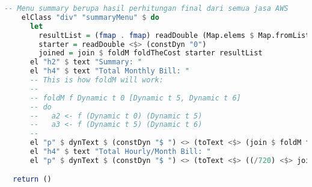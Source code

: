 \documentclass[pi.tex]{subfile}
\begin{document}
\begin{lstlisting}[language=Haskell]
-- Menu summary berupa hasil perhitungan final dari semua jasa AWS
    elClass "div" "summaryMenu" $ do
      let
        resultList = (fmap . fmap) readDouble (Map.elems $ Map.fromList rightM)
        starter = readDouble <$> (constDyn "0")
        joined = join $ foldM foldTheCost starter resultList
      el "h2" $ text "Summary: "
      el "h4" $ text "Total Monthly Bill: "
      -- This is how foldM will work:
      --
      -- foldM f Dynamic t 0 [Dynamic t 5, Dynamic t 6]
      -- do
      --   a2 <- f (Dynamic t 0) (Dynamic t 5)
      --   a3 <- f (Dynamic t 5) (Dynamic t 6)
      --
      el "p" $ dynText $ (constDyn "$ ") <> (toText <$> (join $ foldM foldTheCost starter resultList))
      el "h4" $ text "Total Hourly/Month Bill: "
      el "p" $ dynText $ (constDyn "$ ") <> (toText <$> ((/720) <$> joined))

  return ()
\end{lstlisting}
\end{document}
